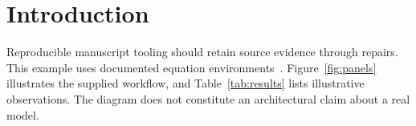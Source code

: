 \section{Introduction}\label{sec:introduction}
Reproducible manuscript tooling should retain source evidence through repairs.
This example uses documented equation environments~\cite{amsguide}.
Figure~\ref{fig:panels} illustrates the supplied workflow, and
Table~\ref{tab:results} lists illustrative observations.
The diagram does not constitute an architectural claim about a real model.
